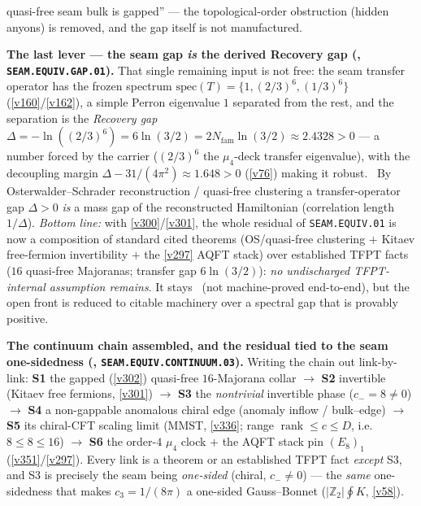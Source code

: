 \documentclass[11pt,a4paper]{article}
\newcommand{\cthree}{c_3}
\newcommand{\Nfam}{N_{\mathrm{fam}}}
\newcommand{\Z}{\mathbb Z}
\begin{document}
\begin{keybox}
quasi-free seam bulk is gapped'' --- the topological-order obstruction (hidden anyons) is removed, and the gap
itself is not manufactured.
\par\smallskip\noindent\textbf{The last lever --- the seam gap \emph{is} the derived Recovery gap
(, \texttt{SEAM.EQUIV.GAP.01}).} That single remaining input is not free: the seam
transfer operator has the frozen spectrum $\mathrm{spec}(T)=\{1,(2/3)^6,(1/3)^6\}$ (\vref{v160}/\vref{v162}),
a simple Perron eigenvalue $1$ separated from the rest, and the separation is the \emph{Recovery gap}
$\Delta=-\ln((2/3)^6)=6\ln(3/2)=2\Nfam\ln(3/2)\approx2.4328>0$ --- a number forced by the carrier ($(2/3)^6$ the
$\mu_4$-deck transfer eigenvalue), with the decoupling margin $\Delta-31/(4\pi^2)\approx1.648>0$ (\vref{v76})
making it robust. \mC\ By Osterwalder--Schrader reconstruction / quasi-free clustering a transfer-operator gap
$\Delta>0$ \emph{is} a mass gap of the reconstructed Hamiltonian (correlation length $1/\Delta$). \emph{Bottom
line:} with \vref{v300}/\vref{v301}, the whole residual of \texttt{SEAM.EQUIV.01} is now a composition of standard
cited theorems (OS/quasi-free clustering $+$ Kitaev free-fermion invertibility $+$ the \vref{v297} AQFT stack)
over established TFPT facts ($16$ quasi-free Majoranas; transfer gap $6\ln(3/2)$): \emph{no undischarged
TFPT-internal assumption remains}. It stays \mO\ (not machine-proved end-to-end), but the open front is reduced
to citable machinery over a spectral gap that is provably positive.
\par\smallskip\noindent\textbf{The continuum chain assembled, and the residual tied to the seam one-sidedness
(, \texttt{SEAM.EQUIV.CONTINUUM.03}).} Writing the chain out
link-by-link: \textbf{S1} the gapped (\vref{v302}) quasi-free $16$-Majorana collar $\to$ \textbf{S2} invertible
(Kitaev free fermions, \vref{v301}) $\to$ \textbf{S3} the \emph{nontrivial} invertible phase ($c_-=8\neq0$) $\to$
\textbf{S4} a non-gappable anomalous chiral edge (anomaly inflow / bulk--edge) $\to$ \textbf{S5} its chiral-CFT
scaling limit (MMST, \vref{v336}; range $\operatorname{rank}\le c\le D$, i.e.\ $8\le8\le16$) $\to$ \textbf{S6} the
order-$4$ $\mu_4$ clock $+$ the AQFT stack pin $(E_8)_1$ (\vref{v351}/\vref{v297}). Every link is a theorem or an
established TFPT fact \emph{except} S3, and S3 is precisely the seam being \emph{one-sided} (chiral, $c_-\neq0$) ---
the \emph{same} one-sidedness that makes $\cthree=1/(8\pi)$ a one-sided Gauss--Bonnet ($|\Z_2|\oint K$, \vref{v58}).

\end{keybox}
\end{document}
